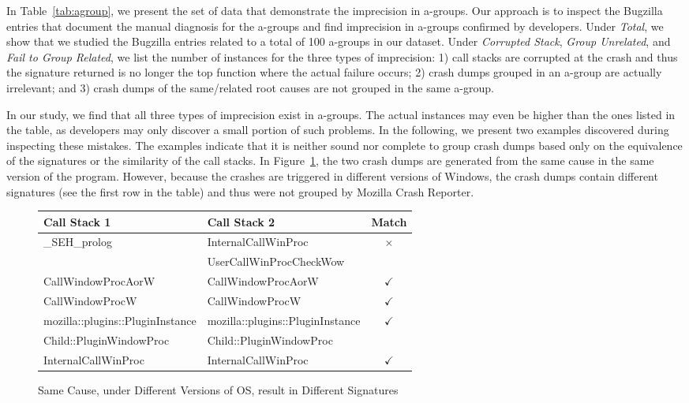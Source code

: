 \documentclass{llncs}
\begin{document}
In Table~\ref{tab:agroup}, we present the set of data that demonstrate the imprecision in a-groups. Our approach is to inspect the Bugzilla entries that document the manual diagnosis for the a-groups and find imprecision in a-groups confirmed by developers. Under {\it Total}, we show that we studied the Bugzilla entries related to a total of 100 a-groups in our dataset. Under {\it Corrupted Stack}, {\it Group Unrelated}, and {\it Fail to Group Related}, we list the number of instances for the three types of imprecision: 1) call stacks are corrupted at the crash and thus the signature returned is no longer the top function where the actual failure occurs; 2) crash dumps grouped in an a-group are actually irrelevant; and 3) crash dumps of the same/related root causes are not grouped in the same a-group.

In our study, we find that all three types of imprecision exist in a-groups. The actual instances may even be higher than the ones listed in the table, as developers may only discover a small portion of such problems. In the following, we present two examples discovered during inspecting these mistakes. The examples indicate that it is neither sound nor complete to group crash dumps based only on the equivalence of the signatures or the similarity of the call stacks. In Figure~\ref{fig:group2}, the two crash dumps are generated from the same cause in the same version of the program. However, because the crashes are triggered in different versions of Windows, the crash dumps contain different signatures (see the first row in the table) and thus were not grouped by Mozilla Crash Reporter.

\begin{figure}
\centering
\begin{tabular}{|l|l||c|}\hline
Call Stack 1 & Call Stack 2 & Match\\\hline\hline
\multirow{2}{*}{\_SEH\_prolog}& InternalCallWinProc &\multirow{2}{*}{$\times$} \\\cline{2-2}
&UserCallWinProcCheckWow &    \\\hline
CallWindowProcAorW & CallWindowProcAorW & $\checkmark$\\\hline
CallWindowProcW  & CallWindowProcW & $\checkmark$\\\hline
mozilla::plugins::PluginInstance&mozilla::plugins::PluginInstance&\multirow{2}{*}{$\checkmark$}\\
Child::PluginWindowProc & Child::PluginWindowProc &  \\\hline
InternalCallWinProc &InternalCallWinProc  & $\checkmark$ \\\hline
\end{tabular}
\caption{Same Cause, under Different Versions of OS, result in Different Signatures~\label{fig:group2}}
\end{figure}
\end{document}
